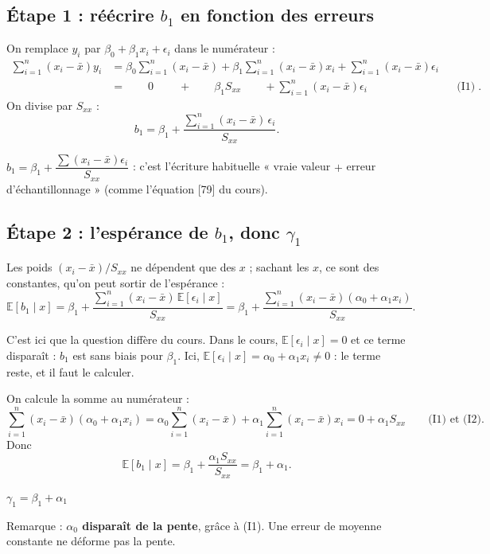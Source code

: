 \documentclass[11pt,a4paper]{article}
\newcommand{\E}{\mathbb{E}}
\newcommand{\sumi}{\sum_{i=1}^{n}}
\newcommand{\Sxx}{S_{xx}}
\begin{document}
\subsection*{Étape 1 : réécrire $b_1$ en fonction des erreurs}

On remplace $y_i$ par $\beta_0+\beta_1x_i+\epsilon_i$ dans le numérateur :
\begin{align*}
\sumi(x_i-\bar x)y_i
&=\beta_0\sumi(x_i-\bar x)+\beta_1\sumi(x_i-\bar x)x_i+\sumi(x_i-\bar x)\epsilon_i\\
&=\qquad 0\qquad\ +\qquad \beta_1\Sxx\qquad +\sumi(x_i-\bar x)\epsilon_i
&&\text{(I1) et (I2)}.
\end{align*}
On divise par $\Sxx$ :
\[
b_1=\beta_1+\frac{\sumi(x_i-\bar x)\,\epsilon_i}{\Sxx}.
\]

\begin{resultat}
$b_1=\beta_1+\dfrac{\sum(x_i-\bar x)\epsilon_i}{\Sxx}$ : c'est l'écriture habituelle « vraie valeur $+$ erreur d'échantillonnage » (comme l'équation [79] du cours).
\end{resultat}

\subsection*{Étape 2 : l'espérance de $b_1$, donc $\gamma_1$}

Les poids $(x_i-\bar x)/\Sxx$ ne dépendent que des $x$ ; sachant les $x$, ce sont des constantes, qu'on peut sortir de l'espérance :
\[
\E[b_1\mid x]=\beta_1+\frac{\sumi(x_i-\bar x)\,\E[\epsilon_i\mid x]}{\Sxx}
=\beta_1+\frac{\sumi(x_i-\bar x)(\alpha_0+\alpha_1x_i)}{\Sxx}.
\]

\begin{pourquoi}
C'est ici que la question diffère du cours. Dans le cours, $\E[\epsilon_i\mid x]=0$ et ce terme disparaît : $b_1$ est sans biais pour $\beta_1$. Ici, $\E[\epsilon_i\mid x]=\alpha_0+\alpha_1x_i\neq0$ : le terme reste, et il faut le calculer.
\end{pourquoi}

On calcule la somme au numérateur :
\[
\sumi(x_i-\bar x)(\alpha_0+\alpha_1x_i)
=\alpha_0\sumi(x_i-\bar x)+\alpha_1\sumi(x_i-\bar x)x_i
=0+\alpha_1\Sxx
\qquad\text{(I1) et (I2)}.
\]
Donc
\[
\E[b_1\mid x]=\beta_1+\frac{\alpha_1\Sxx}{\Sxx}=\beta_1+\alpha_1 .
\]

\begin{resultat}
$\boxed{\gamma_1=\beta_1+\alpha_1}$

Remarque : \textbf{$\alpha_0$ disparaît de la pente}, grâce à (I1). Une erreur de moyenne constante ne déforme pas la pente.
\end{resultat}
\end{document}
